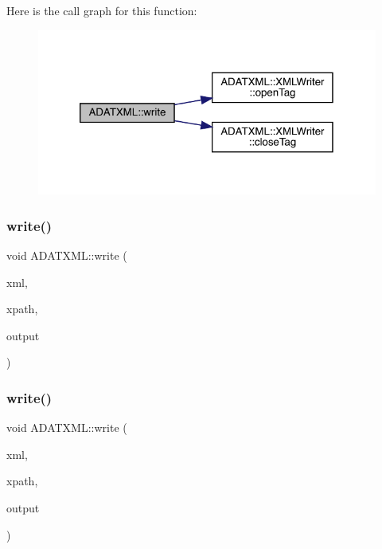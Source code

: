 Here is the call graph for this function\+:\nopagebreak
\begin{figure}[H]
\begin{center}
\leavevmode
\includegraphics[width=320pt]{d2/da3/group__io_gab54b00e1a7cbc507061351d54d6de9fe_cgraph}
\end{center}
\end{figure}
\mbox{\label{group__io_ga5ca658ba9d302064625a4be34293839a}} 
\subsubsection{\texorpdfstring{write()}{write()}\hspace{0.1cm}{\footnotesize\ttfamily [40/58]}}
{\footnotesize\ttfamily void A\+D\+A\+T\+X\+M\+L\+::write (\begin{DoxyParamCaption}\item[{\mbox{\hyperlink{classADATXML_1_1XMLWriter}{X\+M\+L\+Writer}} \&}]{xml,  }\item[{const std\+::string \&}]{xpath,  }\item[{const std\+::vector$<$ bool $>$ \&}]{output }\end{DoxyParamCaption})}

\mbox{\label{group__io_gaab9fb8d6cd603f8b6b5c6b493935eade}} 
\subsubsection{\texorpdfstring{write()}{write()}\hspace{0.1cm}{\footnotesize\ttfamily [41/58]}}
{\footnotesize\ttfamily void A\+D\+A\+T\+X\+M\+L\+::write (\begin{DoxyParamCaption}\item[{\mbox{\hyperlink{classADATXML_1_1XMLWriter}{X\+M\+L\+Writer}} \&}]{xml,  }\item[{const std\+::string \&}]{xpath,  }\item[{const std\+::list$<$ int $>$ \&}]{output }\end{DoxyParamCaption})}

